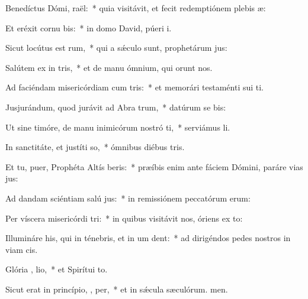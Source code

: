 \item Benedíctus Dómi,  raël:~* quia visitávit, et fecit redemptiónem plebis æ:
\item Et eréxit cornu  bis:~* in domo David, púeri i.
\item Sicut locútus est   rum,~* qui a sǽculo sunt, prophetárum jus:
\item Salútem ex in tris,~* et de manu ómnium, qui orunt nos.
\item Ad faciéndam misericórdiam cum  tris:~* et memorári testaménti sui ti.
\item Jusjurándum, quod jurávit ad Abra  trum,~* datúrum se bis:
\item Ut sine timóre, de manu inimicórum nostró ti,~* serviámus li.
\item In sanctitáte, et justíti  so,~* ómnibus diébus tris.
\item Et tu, puer, Prophéta Altís beris:~* præíbis enim ante fáciem Dómini, paráre vias jus:
\item Ad dandam sciéntiam salú  jus:~* in remissiónem peccatórum erum:
\item Per víscera misericórdi  tri:~* in quibus visitávit nos, óriens ex to:
\item Illumináre his, qui in ténebris, et in um  dent:~* ad dirigéndos pedes nostros in viam cis.
\item Glória ,  lio,~* et Spirítui to.
\item Sicut erat in princípio,  ,  per,~* et in sǽcula sæculórum. men.
